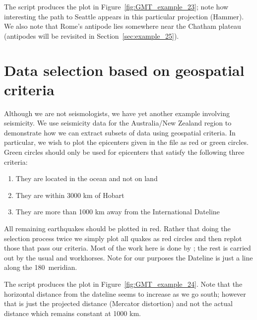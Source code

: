 
The script produces the plot in Figure~\ref{fig:GMT_example_23}; note how
interesting the path to Seattle appears in this particular projection (Hammer).
We also note that Rome's antipode lies somewhere near the Chatham plateau (antipodes
will be revisited in Section~\ref{sec:example_25}).


\section{Data selection based on geospatial criteria}

Although we are not seismologists, we have yet another example involving seismicity.
We use seismicity data for the Australia/New Zealand region to demonstrate how we can
extract subsets of data using geospatial criteria.  In particular, we wish to plot
the epicenters given in the file  as red or green circles.
Green circles should only be used for epicenters that satisfy the following three criteria:
\begin{enumerate}
\item They are located in the ocean and not on land
\item They are within 3000 km of Hobart
\item They are more than 1000 km away from the International Dateline
\end{enumerate}
All remaining earthquakes should be plotted in red.  Rather that doing the selection
process twice we simply plot all quakes as red circles and then replot those that
pass our criteria.  Most of the work here is done by ; the rest
is carried out by the usual  and  workhorses.  Note
for our purposes the Dateline is just a line along the 180\DS\ meridian.


The script produces the plot in Figure~\ref{fig:GMT_example_24}.  Note that the
horizontal distance from the dateline seems to increase as we go south; however that
is just the projected distance (Mercator distortion) and not the actual distance
which remains constant at 1000 km.


